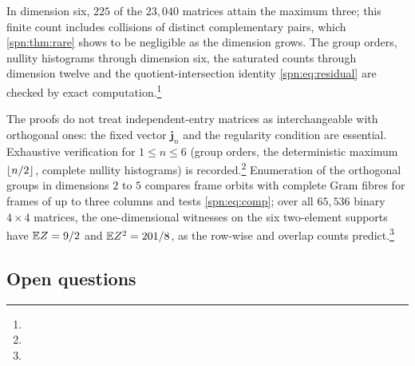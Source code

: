 In dimension six, $225$ of the $23{,}040$ matrices attain the maximum three; this finite count
includes collisions of distinct complementary pairs, which \cref{spn:thm:rare} shows to be
negligible as the dimension grows. The group orders, nullity histograms through dimension six,
the saturated counts through dimension twelve and the quotient-intersection identity
\eqref{spn:eq:residual} are checked by exact
computation.\footnote{\raggedright{}}

The proofs do not treat independent-entry matrices as interchangeable with orthogonal ones: the
fixed vector $\mathbf j_n$ and the regularity condition are essential. Exhaustive verification
for $1\le n\le6$ (group orders, the deterministic maximum $\lfloor n/2\rfloor$, complete nullity
histograms) is
recorded.\footnote{\raggedright{}}
Enumeration of the orthogonal groups in dimensions $2$ to $5$ compares frame orbits with complete
Gram fibres for frames of up to three columns and tests \eqref{spn:eq:comp}; over all $65{,}536$
binary $4\times4$ matrices, the one-dimensional witnesses on the six two-element supports have
$\mathbb{E} Z=9/2$ and $\mathbb{E} Z^2=201/8$, as the row-wise and overlap counts
predict.\footnote{\raggedright{}}


\subsection{Open questions}\label{cmp:sec:open}
{\raggedright{}}

